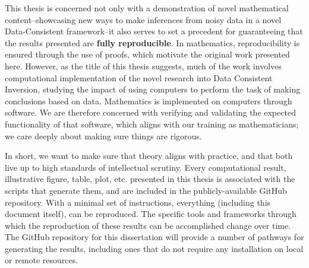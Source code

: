 This thesis is concerned not only with a demonstration of novel mathematical content\---showcasing new ways to make inferences from noisy data in a novel Data-Consistent framework\---it also serves to set a precedent for guaranteeing that the results presented are \textbf{fully reproducible}.
In mathematics, reproducibility is ensured through the use of proofs, which motivate the original work presented here.
However, as the title of this thesis suggests, much of the work involves computational implementation of the novel research into Data Consistent Inversion, studying the impact of using computers to perform the task of making conclusions based on data.
Mathematics is implemented on computers through software.
We are therefore concerned with verifying and validating the expected functionality of that software, which aligns with our training as mathematicians; we care deeply about making sure things are rigorous.

In short, we want to make sure that theory aligns with practice, and that both live up to high standards of intellectual scrutiny.
Every computational result, illustrative figure, table, plot, etc. presented in this thesis is associated with the scripts that generate them, and are included in the publicly-available GitHub repository.
With a minimal set of instructions, everything (including this document itself), can be reproduced.
The specific tools and frameworks through which the reproduction of these results can be accomplished change over time.
The GitHub repository for this dissertation will provide a number of pathways for generating the results, including ones that do not require any installation on local or remote resources.

\FloatBarrier
